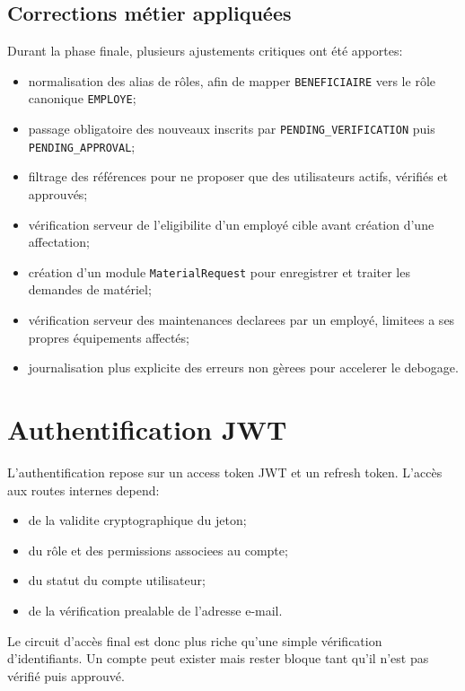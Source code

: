﻿\documentclass[12pt,a4paper,oneside]{report}
\begin{document}
\subsection{Corrections métier appliquées}
Durant la phase finale, plusieurs ajustements critiques ont été apportes:
\begin{itemize}
  \item normalisation des alias de rôles, afin de mapper \texttt{BENEFICIAIRE} vers le rôle canonique \texttt{EMPLOYE};
  \item passage obligatoire des nouveaux inscrits par \texttt{PENDING\_VERIFICATION} puis \texttt{PENDING\_APPROVAL};
  \item filtrage des références pour ne proposer que des utilisateurs actifs, vérifiés et approuvés;
  \item vérification serveur de l'eligibilite d'un employé cible avant création d'une affectation;
  \item création d'un module \texttt{MaterialRequest} pour enregistrer et traiter les demandes de matériel;
  \item vérification serveur des maintenances declarees par un employé, limitees a ses propres équipements affectés;
  \item journalisation plus explicite des erreurs non gèrees pour accelerer le debogage.
\end{itemize}

\section{Authentification JWT}
L'authentification repose sur un access token JWT et un refresh token. L'accès aux routes internes depend:
\begin{itemize}
  \item de la validite cryptographique du jeton;
  \item du rôle et des permissions associees au compte;
  \item du statut du compte utilisateur;
  \item de la vérification prealable de l'adresse e-mail.
\end{itemize}

Le circuit d'accès final est donc plus riche qu'une simple vérification d'identifiants. Un compte peut exister mais rester bloque tant qu'il n'est pas vérifié puis approuvé.
\end{document}
